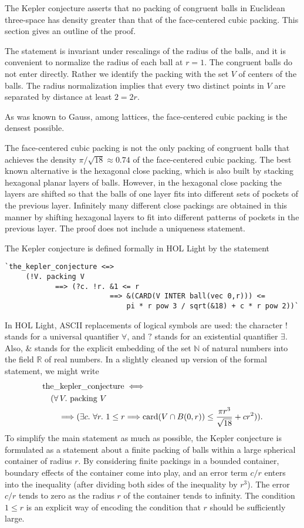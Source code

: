 \documentclass{amsart}
\newcommand{\ring}[1]{\mathbb{#1}}
\newcommand{\op}[1]{\hbox{#1}}
\begin{document}
The Kepler conjecture asserts that no packing of congruent balls in
Euclidean three-space has density greater than that of the
face-centered cubic packing.  This section gives an outline of the
proof.

The statement is invariant under rescalings of the radius of the balls,
and it is convenient to normalize the radius of each ball at $r=1$.
The congruent balls do not enter directly. Rather we identify the packing
with the set $V$ of centers of the balls.  The radius normalization implies
that every two distinct points in $V$ are separated by distance at least
$2 = 2r$.

As was known to Gauss, among lattices, the face-centered cubic packing
is the densest possible.

The face-centered cubic packing is not the only packing of congruent
balls that achieves the density $\pi/\sqrt{18} \approx 0.74$ of the
face-centered cubic packing.  The best known alternative is the
hexagonal close packing, which is also built by stacking hexagonal
planar layers of balls.  However, in the hexagonal close packing the
layers are shifted so that the balls of one layer fits into different
sets of pockets of the previous layer.  Infinitely many different
close packings are obtained in this manner by shifting hexagonal
layers to fit into different patterns of pockets in the previous
layer.  The proof does not include a uniqueness statement.

The Kepler conjecture is defined formally in HOL Light by the statement
\begin{verbatim}
`the_kepler_conjecture <=>
     (!V. packing V
            ==> (?c. !r. &1 <= r
                         ==> &(CARD(V INTER ball(vec 0,r))) <=
                             pi * r pow 3 / sqrt(&18) + c * r pow 2))`
\end{verbatim}
In HOL Light, ASCII replacements of logical symbols are used:
the character $!$ stands for a universal quantifier $\forall$,
and $?$ stands for an existential quantifier $\exists$.
Also, \& stands for the explicit embedding of the set $\ring{N}$ of natural
numbers into the field $\ring{R}$ of real numbers.  In a slightly
cleaned up version of the formal statement, we might write
\begin{align*}
&\op{the\_kepler\_conjecture} \iff\\
&\quad (\forall\, V.\ \op{packing}\ V\\
&\quad\quad \Longrightarrow (\exists c.\ \forall r.\ 1 \le r \Longrightarrow
\op{card}(V \cap B(0,r)) \le
\frac{\pi r^3}{\sqrt{18}} + c r^2)).
\end{align*}
To simplify the main statement as much as possible, the Kepler
conjecture is formulated as a statement about a finite
packing of balls within a large spherical container of radius $r$.  By
considering finite packings in a bounded container, boundary effects
of the container come into play, and an error term $c/r$ enters into
the inequality (after dividing both sides of the inequality by $r^3$).  
The error $c/r$ tends to zero as the radius $r$ of
the container tends to infinity.
The condition $1\le r$ is an explicit way of encoding the
condition that $r$ should be sufficiently large.  
\end{document}
